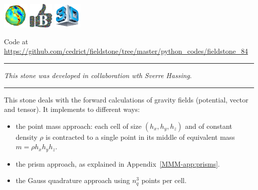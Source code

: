 \includegraphics[height=1.25cm]{images/pictograms/gravity}
\includegraphics[height=1.25cm]{images/pictograms/benchmark}
\includegraphics[height=1.25cm]{images/pictograms/3d}




\begin{center}
Code at \url{https://github.com/cedrict/fieldstone/tree/master/python_codes/fieldstone_84}
\end{center}

\par\noindent\rule{\textwidth}{0.4pt}

{\sl This stone was developed in collaboration wth Sverre Hassing}. 

\par\noindent\rule{\textwidth}{0.4pt}

This stone deals with the forward calculations of gravity fields (potential, vector and tensor).
It implements to different ways: 
\begin{itemize}
\item the point mass approach: each cell of size $(h_x,h_y,h_z)$ and of constant density $\rho$
is contracted to a single point in its middle of equivalent mass $m=\rho h_xh_yh_z$.
\item the prism approach, as explained in Appendix~\ref{MMM-app:prisms}.
\item the Gauss quadrature approach using $n_q^3$ points per cell.
\end{itemize}

